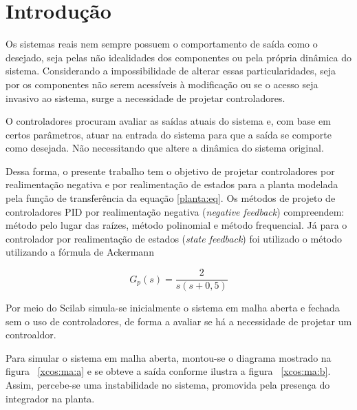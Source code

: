 \section{Introdução}

Os sistemas reais nem sempre possuem o comportamento de saída como o desejado, seja pelas não idealidades dos componentes ou pela própria dinâmica do sistema. Considerando a impossibilidade de alterar essas particularidades, seja por os componentes não serem acessíveis à modificação ou se o acesso seja invasivo ao sistema, surge a necessidade de projetar controladores.

O controladores procuram avaliar as saídas atuais do sistema e, com base em certos parâmetros, atuar na entrada do sistema para que a saída se comporte como desejada. Não necessitando que altere a dinâmica do sistema original. 

Dessa forma, o presente trabalho tem o objetivo de projetar controladores por realimentação negativa e por realimentação de estados para a planta modelada pela função de transferência da equação \ref{planta:eq}. Os métodos de projeto de controladores PID por realimentação negativa (\textit{negative feedback}) compreendem: método pelo lugar das raízes, método polinomial e método frequencial. Já para o controlador por realimentação de estados (\textit{state feedback}) foi utilizado o método utilizando a fórmula de Ackermann

\begin{equation}\label{planta:eq}
    G_p(s) = \frac{2}{s(s+0,5)}
\end{equation}

Por meio do Scilab simula-se inicialmente o sistema em malha aberta e fechada sem o uso de controladores, de forma a avaliar se há a necessidade de projetar um controaldor.

Para simular o sistema em malha aberta, montou-se o diagrama mostrado na figura ~\ref{xcos:ma:a} e se obteve a saída conforme ilustra a figura ~\ref{xcos:ma:b}. Assim, percebe-se uma instabilidade no sistema, promovida pela presença do integrador na planta.

